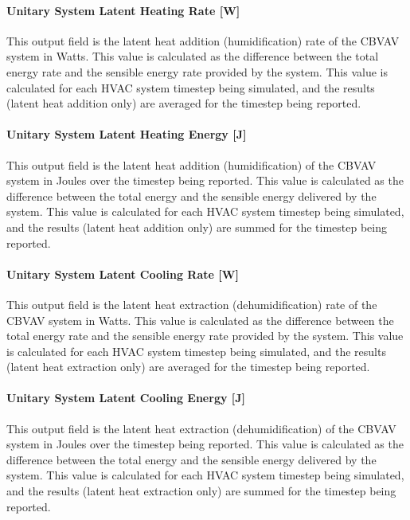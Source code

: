\paragraph{Unitary System Latent Heating Rate {[}W{]}}\label{unitary-system-latent-heating-rate-w-2}

This output field is the latent heat addition (humidification) rate of the CBVAV system in Watts. This value is calculated as the difference between the total energy rate and the sensible energy rate provided by the system. This value is calculated for each HVAC system timestep being simulated, and the results (latent heat addition only) are averaged for the timestep being reported.

\paragraph{Unitary System Latent Heating Energy {[}J{]}}\label{unitary-system-latent-heating-energy-j}

This output field is the latent heat addition (humidification) of the CBVAV system in Joules over the timestep being reported. This value is calculated as the difference between the total energy and the sensible energy delivered by the system. This value is calculated for each HVAC system timestep being simulated, and the results (latent heat addition only) are summed for the timestep being reported.

\paragraph{Unitary System Latent Cooling Rate {[}W{]}}\label{unitary-system-latent-cooling-rate-w-2}

This output field is the latent heat extraction (dehumidification) rate of the CBVAV system in Watts. This value is calculated as the difference between the total energy rate and the sensible energy rate provided by the system. This value is calculated for each HVAC system timestep being simulated, and the results (latent heat extraction only) are averaged for the timestep being reported.

\paragraph{Unitary System Latent Cooling Energy {[}J{]}}\label{unitary-system-latent-cooling-energy-j}

This output field is the latent heat extraction (dehumidification) of the CBVAV system in Joules over the timestep being reported. This value is calculated as the difference between the total energy and the sensible energy delivered by the system. This value is calculated for each HVAC system timestep being simulated, and the results (latent heat extraction only) are summed for the timestep being reported.


